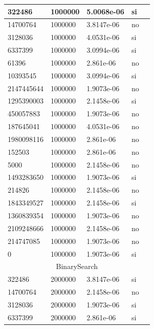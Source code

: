\documentclass[12pt, fleqn]{article}                             %
\theoremstyle{break}                                            %
\begin{document}
\begin{longtable}{|m{5em}|m{5em}|m{10em}|m{5em}|@{}m{0pt}@{}}
            322486& 1000000  & 5.0068e-06 & si &\\[1em]    \hline
            14700764& 1000000  & 3.8147e-06 & no &\\[1em]    \hline
            3128036& 1000000  & 4.0531e-06 & si &\\[1em]    \hline
            6337399& 1000000  & 3.0994e-06 & si &\\[1em]    \hline
            61396& 1000000  & 2.861e-06 & no &\\[1em]    \hline
            10393545& 1000000  & 3.0994e-06 & si &\\[1em]    \hline
            2147445644& 1000000  & 1.9073e-06 & no &\\[1em]    \hline
            1295390003& 1000000  & 2.1458e-06 & si &\\[1em]    \hline
            450057883& 1000000  & 1.9073e-06 & no &\\[1em]    \hline
            187645041& 1000000  & 4.0531e-06 & no &\\[1em]    \hline
            1980098116& 1000000  & 2.861e-06 & no &\\[1em]    \hline
            152503& 1000000  & 2.861e-06 & no &\\[1em]    \hline
            5000& 1000000  & 2.1458e-06 & no &\\[1em]    \hline
            1493283650& 1000000  & 1.9073e-06 & si &\\[1em]    \hline
            214826& 1000000  & 2.1458e-06 & no &\\[1em]    \hline
            1843349527& 1000000  & 2.1458e-06 & si &\\[1em]    \hline
            1360839354& 1000000  & 1.9073e-06 & no &\\[1em]    \hline
            2109248666& 1000000  & 2.1458e-06 & no &\\[1em]    \hline
            214747085& 1000000  & 1.9073e-06 & no &\\[1em]    \hline
            0& 1000000  & 1.9073e-06 & si &\\[1em]    \hline
            \multicolumn{5}{|c|}{BinarySearch}   \\          \hline
            322486& 2000000  & 3.8147e-06 & si &\\[1em]    \hline
            14700764& 2000000  & 2.1458e-06 & no &\\[1em]    \hline
            3128036& 2000000  & 1.9073e-06 & si &\\[1em]    \hline
            6337399& 2000000  & 2.861e-06 & si &\\[1em]    \hline

\end{longtable}
\end{document}
